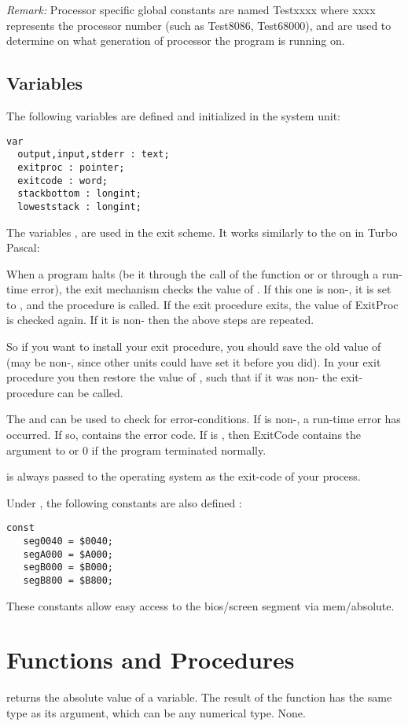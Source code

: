 \documentclass{report}
\begin{document}
\emph{ Remark: } Processor specific global constants are named Testxxxx
where xxxx represents the processor number (such as Test8086, Test68000),
and are used to determine on what generation of processor the program
is running on.

\subsection{Variables}
The following variables are defined and initialized in the system unit:
\begin{verbatim}
var
  output,input,stderr : text;
  exitproc : pointer;
  exitcode : word;
  stackbottom : longint;
  loweststack : longint;
\end{verbatim}
The variables ,  are used in the \fpc exit
scheme. It works similarly to the on in Turbo Pascal:

When a program halts (be it through the call of the  function or
 or through a run-time error), the exit mechanism checks the value
of . If this one is non-, it is set to , and
the procedure is called. If the exit procedure exits, the value of ExitProc
is checked again. If it is non- then the above steps are repeated.

So if you want to install your exit procedure, you should save the old value
of  (may be non-, since other units could have set it before 
you did). In your exit procedure you then restore the value of
, such that if it was non- the exit-procedure can be
called.

The  and  can be used to check for
error-conditions. If  is non-, a run-time error has
occurred. If so,  contains the error code. If  is
, then {ExitCode} contains the argument to  or 0 if the
program terminated normally.

 is always passed to the operating system as the exit-code of
your process.

Under , the following constants are also defined :
\begin{verbatim}
const
   seg0040 = $0040;
   segA000 = $A000;
   segB000 = $B000;
   segB800 = $B800;
\end{verbatim}
These constants allow easy access to the bios/screen segment via mem/absolute.

\section{Functions and Procedures}
{ returns the absolute value of a variable. The result of the
function has the same type as its argument, which can be any numerical
type.}
{None.}
{}
\end{document}
